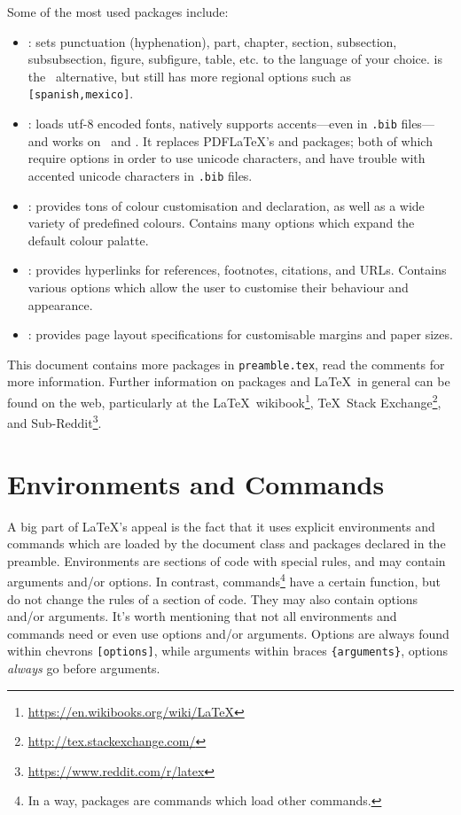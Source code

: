 Some of the most used packages include:
\begin{itemize}
\item {}: sets punctuation (hyphenation), part, chapter,
  section, subsection, subsubsection, figure, subfigure, table,
  etc. to the language of your choice.   is the
  \XeLaTeX~alternative, but  still has more regional
  options such as \verb|[spanish,mexico]|.
\item {}: loads utf-8 encoded fonts, natively supports
  accents---even in \texttt{.bib} files---and works on \XeLaTeX~and
  \LuaTeX.  It replaces PDF\LaTeX's  and 
  packages; both of which require options in order to use unicode
  characters, and have trouble with accented unicode characters in
  \texttt{.bib} files.
\item {}: provides tons of colour customisation and
  declaration, as well as a wide variety of predefined
  colours.  Contains many options which expand the default colour
  palatte.
\item {}: provides hyperlinks for references, footnotes,
  citations, and URLs.  Contains various options which allow the user
  to customise their behaviour and appearance.
\item {}: provides page layout specifications for
  customisable margins and paper sizes.
\end{itemize}
This document contains more packages in \texttt{preamble.tex}, read
the comments for more information.  Further information on packages
and \LaTeX~in general can be found on the web, particularly at the
\LaTeX~wikibook\footnote{\url{https://en.wikibooks.org/wiki/LaTeX}},
\TeX~Stack Exchange\footnote{\url{http://tex.stackexchange.com/}}, and
Sub-Reddit\footnote{\url{https://www.reddit.com/r/latex}}.
%
\section{Environments and Commands}\label{s:ec}
%
A big part of \LaTeX's appeal is the fact that it uses explicit
environments and commands which are loaded by the document class and
packages declared in the preamble.  Environments are sections of code
with special rules, and may contain arguments and/or options.  In
contrast, commands\footnote{In a way, packages are commands which load
  other commands.} have a certain function, but do not change the
rules of a section of code.  They may also contain options and/or
arguments.  It's worth mentioning that not all environments and
commands need or even use options and/or arguments.  Options are
always found within chevrons \verb|[options]|, while arguments within
braces \verb|{arguments}|, options \emph{always} go before arguments.

